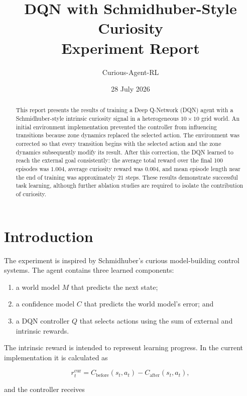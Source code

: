 \documentclass[11pt,a4paper]{article}
\title{DQN with Schmidhuber-Style Curiosity\\
       Experiment Report}
\author{Curious-Agent-RL}
\date{28 July 2026}
\begin{document}
\maketitle

\begin{abstract}
This report presents the results of training a Deep Q-Network (DQN) agent
with a Schmidhuber-style intrinsic curiosity signal in a heterogeneous
$10\times10$ grid world. An initial environment implementation prevented the
controller from influencing transitions because zone dynamics replaced the
selected action. The environment was corrected so that every transition begins
with the selected action and the zone dynamics subsequently modify its result.
After this correction, the DQN learned to reach the external goal consistently:
the average total reward over the final 100 episodes was $1.004$, average
curiosity reward was $0.004$, and mean episode length near the end of training
was approximately $21$ steps. These results demonstrate successful task
learning, although further ablation studies are required to isolate the
contribution of curiosity.
\end{abstract}

\section{Introduction}

The experiment is inspired by Schmidhuber's curious model-building control
systems. The agent contains three learned components:

\begin{enumerate}
    \item a world model $M$ that predicts the next state;
    \item a confidence model $C$ that predicts the world model's error; and
    \item a DQN controller $Q$ that selects actions using the sum of external
          and intrinsic rewards.
\end{enumerate}

The intrinsic reward is intended to represent learning progress. In the current
implementation it is calculated as

\begin{equation}
    r^{\mathrm{cur}}_t =
    C_{\mathrm{before}}(s_t,a_t) -
    C_{\mathrm{after}}(s_t,a_t),
\end{equation}

and the controller receives
\end{document}
